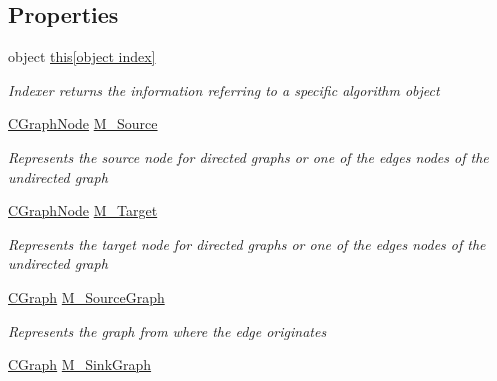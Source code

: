 \subsection*{Properties}
\begin{DoxyCompactItemize}
\item 
object \hyperlink{class_graph_library_1_1_c_graph_edge_ad5cb4b4ef0423da4a0c2b156cf3fb3f7}{this\mbox{[}object index\mbox{]}}
\begin{DoxyCompactList}\small\item\em Indexer returns the information referring to a specific algorithm object \end{DoxyCompactList}\item 
\hyperlink{class_graph_library_1_1_c_graph_node}{C\+Graph\+Node} \hyperlink{class_graph_library_1_1_c_graph_edge_a79ff7b9982b737ed66755c8baf51a31a}{M\+\_\+\+Source}
\begin{DoxyCompactList}\small\item\em Represents the source node for directed graphs or one of the edge\textquotesingle{}s nodes of the undirected graph \end{DoxyCompactList}\item 
\hyperlink{class_graph_library_1_1_c_graph_node}{C\+Graph\+Node} \hyperlink{class_graph_library_1_1_c_graph_edge_a42c115e4937a251f524edc71a2b1ea7a}{M\+\_\+\+Target}
\begin{DoxyCompactList}\small\item\em Represents the target node for directed graphs or one of the edge\textquotesingle{}s nodes of the undirected graph \end{DoxyCompactList}\item 
\hyperlink{class_graph_library_1_1_c_graph}{C\+Graph} \hyperlink{class_graph_library_1_1_c_graph_edge_aa1b8faca82c1d9fe1cafef980a1cbb82}{M\+\_\+\+Source\+Graph}
\begin{DoxyCompactList}\small\item\em Represents the graph from where the edge originates \end{DoxyCompactList}\item 
\hyperlink{class_graph_library_1_1_c_graph}{C\+Graph} \hyperlink{class_graph_library_1_1_c_graph_edge_a0548b68a08517457f2bd5fbec3eb0628}{M\+\_\+\+Sink\+Graph}

\end{DoxyCompactItemize}
